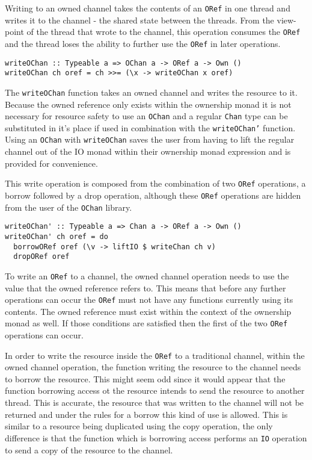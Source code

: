 \documentclass[onehalf,11pt]{beavtex}
\begin{document}
Writing to an owned channel takes the contents of an \texttt{ORef} in
one thread and writes it to the channel - the shared state between the threads.
From the view-point of the thread that wrote to the channel, this operation
consumes the \texttt{ORef} and the thread loses the ability to further use the
\texttt{ORef} in later operations.

\begin{verbatim}
writeOChan :: Typeable a => OChan a -> ORef a -> Own ()
writeOChan ch oref = ch >>= (\x -> writeOChan x oref)
\end{verbatim}

The \texttt{writeOChan} function takes an owned channel and writes the
resource to it. Because the owned reference only exists within the
ownership monad it is not necessary for resource safety to use
an \texttt{OChan} and a regular \texttt{Chan} type can be substituted
in it's place if used in combination with the \texttt{writeOChan'} function.
Using an \texttt{OChan} with \texttt{writeOChan} saves the user
from having to lift the regular channel out of the IO monad within their
ownership monad expression and is provided for convenience.

This write operation is composed from the combination of two
\texttt{ORef} operations, a borrow followed by a drop operation, 
although these \texttt{ORef} operations are hidden from the user of the
\texttt{OChan} library.

\begin{verbatim}
writeOChan' :: Typeable a => Chan a -> ORef a -> Own ()
writeOChan' ch oref = do
  borrowORef oref (\v -> liftIO $ writeChan ch v)
  dropORef oref
\end{verbatim}

To write an \texttt{ORef} to a channel, the owned channel operation
needs to use the value that the owned reference refers to.  This means
that before any further operations can occur the \texttt{ORef} must not have any
functions currently using its contents. The owned reference must exist within
the context of the ownership monad as well.
If those conditions are satisfied then the first of the two \texttt{ORef}
operations can occur.

In order to write the resource inside the \texttt{ORef} to a traditional
channel, within the owned channel operation, the function writing the resource
to the channel needs to borrow the resource.
This might seem odd since it would appear that the function borrowing access
ot the resource intends to send the resource to another thread.
This is accurate, the resource that was written to the channel will not be
returned and under the rules for a borrow this kind of use is allowed.
This is similar to a resource being duplicated using the copy operation, the
only difference is that the function which is borrowing access 
performs an \texttt{IO} operation to send a copy of the resource to the
channel.
\end{document}
